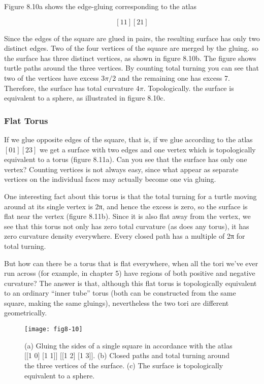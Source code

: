 \documentclass{book}
\begin{document}
Figure 8.10a shows the edge-gluing corresponding to the atlas

$$[1 1] [2 1]$$

Since the edges of the square are glued in pairs, the resulting surface
has only two distinct edges. Two of the four vertices of the square are
merged by the gluing. so the surface has three distinct vertices, as shown
in figure 8.10b. The figure shows turtle paths around the three vertices.
By counting total turning you can see that two of the vertices have excess
$3 \pi / 2$ and the remaining one has excess 7. Therefore, the surface has
total curvature $4 \pi$. Topologically. the surface is equivalent to a sphere,
as illustrated in figure 8.10c.

\subsubsection{Flat Torus}

If we glue opposite edges of the square, that is, if we glue according to
the atlas
$[0 1] [2 3]$
 we get a surface with two edges and one vertex which is topologically
equivalent to a torus (figure 8.11a). Can you see that the surface has
only one vertex? Counting vertices is not always easy, since what appear
as separate vertices on the individual faces may actually become one via
gluing.

One interesting fact about this torus is that the total turning for a
turtle moving around at its single vertex is 2π, and hence the excess is
zero, so the surface is flat near the vertex (figure 8.11b). Since it is also
flat away from the vertex, we see that this torus not only has zero total
curvature (as does any torus), it has zero curvature density everywhere.
Every closed path has a multiple of 2π for total turning.

But how can there be a torus that is flat everywhere, when all the tori
we've ever run across (for example, in chapter 5) have regions of both 
positive and negative curvature? The answer is that, although this flat
torus is topologically equivalent to an ordinary ``inner tube'' torus (both
can be constructed from the same square, making the same gluings),
nevertheless the two tori are different geometrically.

\begin{figure}
\begin{center}
\texttt{[image: fig8-10]}
\caption{(a) Gluing the sides of a single square in accordance with the atlas [[1 0] [1 1]] [[1 2] [1 3]]. (b) Closed paths and total turning around the three vertices of the surface. (c) The surface is topologically equivalent to a sphere.}
\end{center}
\end{figure}
\end{document}
